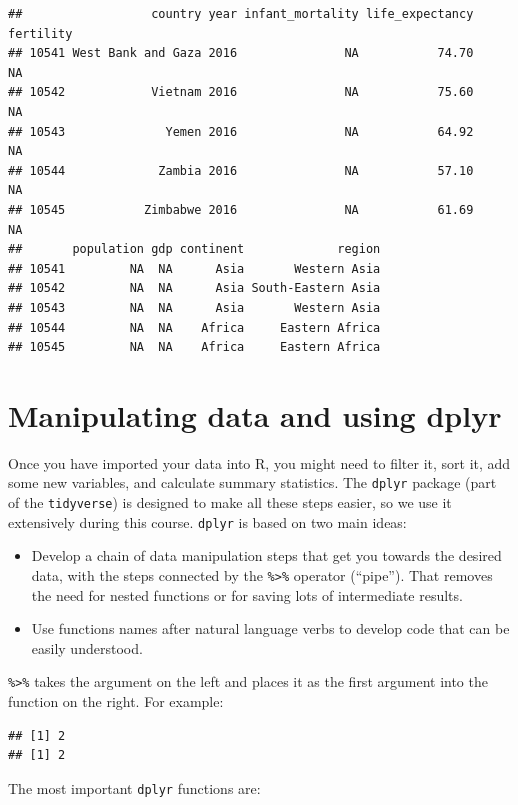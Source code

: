 \documentclass[
]{book}
\providecommand{\tightlist}{%
  \setlength{\itemsep}{0pt}\setlength{\parskip}{0pt}}
\begin{document}
\begin{verbatim}
##                  country year infant_mortality life_expectancy fertility
## 10541 West Bank and Gaza 2016               NA           74.70        NA
## 10542            Vietnam 2016               NA           75.60        NA
## 10543              Yemen 2016               NA           64.92        NA
## 10544             Zambia 2016               NA           57.10        NA
## 10545           Zimbabwe 2016               NA           61.69        NA
##       population gdp continent             region
## 10541         NA  NA      Asia       Western Asia
## 10542         NA  NA      Asia South-Eastern Asia
## 10543         NA  NA      Asia       Western Asia
## 10544         NA  NA    Africa     Eastern Africa
## 10545         NA  NA    Africa     Eastern Africa
\end{verbatim}

\hypertarget{manipulating-data-and-using-dplyr}{%
\section{Manipulating data and using dplyr}\label{manipulating-data-and-using-dplyr}}

Once you have imported your data into R, you might need to filter it, sort it, add some new variables, and calculate summary statistics. The \texttt{dplyr} package (part of the \texttt{tidyverse}) is designed to make all these steps easier, so we use it extensively during this course. \texttt{dplyr} is based on two main ideas:

\begin{itemize}
\tightlist
\item
  Develop a chain of data manipulation steps that get you towards the desired data, with the steps connected by the \texttt{\%\textgreater{}\%} operator (``pipe''). That removes the need for nested functions or for saving lots of intermediate results.
\item
  Use functions names after natural language verbs to develop code that can be easily understood.
\end{itemize}

\texttt{\%\textgreater{}\%} takes the argument on the left and places it as the first argument into the function on the right. For example:

\begin{verbatim}
## [1] 2
## [1] 2
\end{verbatim}

The most important \texttt{dplyr} functions are:
\end{document}
